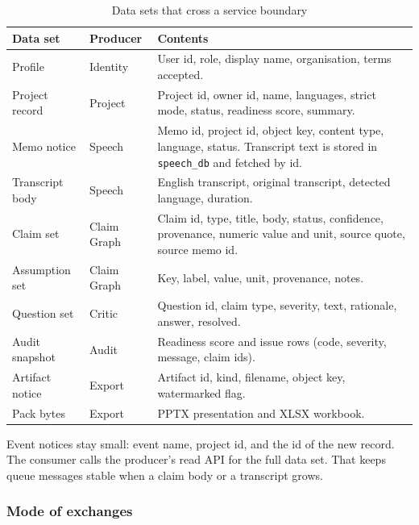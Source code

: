 \documentclass[11pt,a4paper]{article}
\begin{document}
\begin{table}[ht]
\centering
\caption{Data sets that cross a service boundary}
\label{tab:datasets}
\small
\begin{tabularx}{\textwidth}{@{}l l X@{}}
\toprule
\textbf{Data set} & \textbf{Producer} & \textbf{Contents} \\
\midrule
Profile &
Identity &
User id, role, display name, organisation, terms accepted. \\
Project record &
Project &
Project id, owner id, name, languages, strict mode, status, readiness score, summary. \\
Memo notice &
Speech &
Memo id, project id, object key, content type, language, status. Transcript text is stored in \texttt{speech\_db} and fetched by id. \\
Transcript body &
Speech &
English transcript, original transcript, detected language, duration. \\
Claim set &
Claim Graph &
Claim id, type, title, body, status, confidence, provenance, numeric value and unit, source quote, source memo id. \\
Assumption set &
Claim Graph &
Key, label, value, unit, provenance, notes. \\
Question set &
Critic &
Question id, claim type, severity, text, rationale, answer, resolved. \\
Audit snapshot &
Audit &
Readiness score and issue rows (code, severity, message, claim ids). \\
Artifact notice &
Export &
Artifact id, kind, filename, object key, watermarked flag. \\
Pack bytes &
Export &
PPTX presentation and XLSX workbook. \\
\bottomrule
\end{tabularx}
\end{table}

Event notices stay small: event name, project id, and the id of the new record. The consumer calls the producer's read API for the full data set. That keeps queue messages stable when a claim body or a transcript grows.

\subsubsection{Mode of exchanges}
\end{document}
